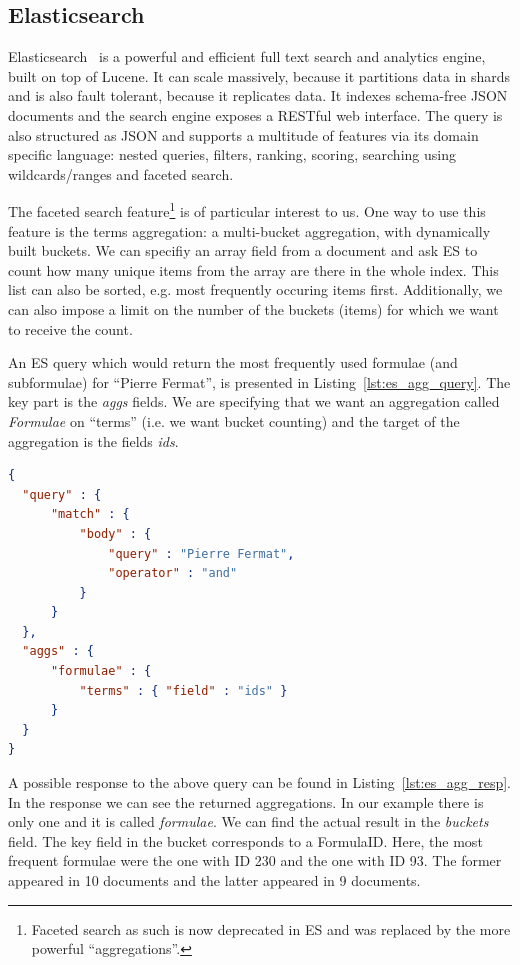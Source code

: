 \documentclass[a4paper,11pt,oneside]{article}
\begin{document}
\subsection{Elasticsearch}\label{subsec:prelim:els}
Elasticsearch~\cite{esl:online} is a powerful and efficient full text search
and analytics engine, built on top of Lucene. It can scale massively, because
it partitions data in shards and is also fault tolerant, because it replicates
data.  It indexes schema-free JSON documents and the search engine exposes a
RESTful web interface.  The query is also structured as JSON and supports a
multitude of features via its domain specific language:  nested queries,
filters, ranking, scoring, searching using wildcards/ranges and faceted search.

The faceted search feature\footnote{Faceted search as such is now deprecated in
ES and was replaced by the more powerful ``aggregations''.} is of particular
interest to us.
One way to use this feature is the terms aggregation: a multi-bucket
aggregation, with dynamically built buckets.
We can specifiy an array field from a document and ask ES to count how many
unique items from the array are there in the whole index.
This list can also be sorted, e.g. most frequently occuring items first.
Additionally, we can also impose a limit on the number of the buckets (items)
for which we want to receive the count.

An ES query which would return the most frequently used formulae (and
subformulae) for ``Pierre Fermat'', is presented in
Listing~\ref{lst:es_agg_query}. The key part is the \emph{aggs} fields. We are
specifying that we want an aggregation called \textit{Formulae} on ``terms''
(i.e. we want bucket counting) and the target of the aggregation is the fields
\emph{ids}.

\begin{lstlisting}[language=json,firstnumber=1,caption=Elastic Search Term
Aggregation Query, captionpos=b, label=lst:es_agg_query]
{
  "query" : {
      "match" : {
          "body" : {
              "query" : "Pierre Fermat",
              "operator" : "and"
          }
      }
  },
  "aggs" : {
      "formulae" : {
          "terms" : { "field" : "ids" }
      }
  }
}
\end{lstlisting}

A possible response to the above query can be found in
Listing~\ref{lst:es_agg_resp}. In the response we can see the returned
aggregations. In our example there is only one and it is called
\emph{formulae}. We can find the actual result in the \emph{buckets} field. The
\textsf{key} field in the bucket corresponds to a \textsf{FormulaID}.
Here, the most frequent formulae were the one with ID 230 and the one with ID
93. The former appeared in 10 documents and the latter appeared in 9 documents.
\end{document}
